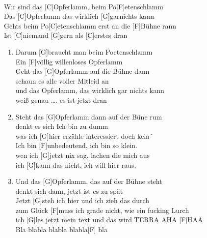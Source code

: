 \def\Titel{Opferlamm}
\def\Interpret{Die BÄND}
\def\Referenz{\ldots beim Poetenschlamm}

\LiedSetup{}

\begin{guitarMagic}
[Refrain]\\
    Wir sind das [C]Opferlamm, beim Po[F]etenschlamm\\
    Das [C]Opferlamm das wirklich [G]garnichts kann\\
    Gehts beim Po[C]etenschlamm erst an die [F]Bühne rann\\
    Ist [C]niemand [G]gern als [C]erstes dran

    \begin{enumerate}
        \item Darum [G]braucht man beim Poetenschlamm\\
            Ein [F]völlig willenloses Opferlamm\\
            Geht das [G]Opferlamm auf die Bühne dann\\
            [F]schaun es alle voller Mitleid an\\
            [G]und das Opferlamm, das wirklich gar nichts kann\\
            [G]weiß genau \ldots. es ist jetzt dran

            \liedweiter


        \item Steht das [G]Opferlamm dann auf der Büne rum\\
            [F]denkt es sich  Ich bin zu dumm\\
            was ich [G]hier erzähle interessiert doch kein´\\
            Ich bin [F]unbedeutend, ich bin so klein.\\
            wen ich [G]jetzt nix sag, lachen die mich aus\\
            ich [G]kann das nicht, ich will hier raus.


        \item Und das [G]Opferlamm, das auf der Bühne steht\\
            [F]denkt sich dann, jetzt ist es zu spät\\
            Jetzt [G]steh ich hier und ich zieh das durch\\
            zum Glück [F]muss ich grade nicht, wie ein fucking Lurch\\
            ich [G]les jetzt mein text und das wird TERRA AHA [F]HAA \\
            [G] Bla blabla blabla blabla[F] bla

    \end{enumerate}
\end{guitarMagic}
